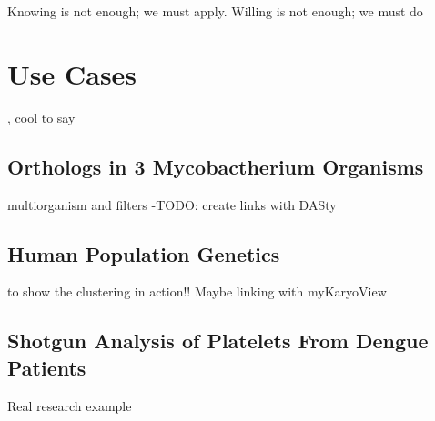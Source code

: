 \begin{savequote}[75mm] 
Knowing is not enough; we must apply. Willing is not enough; we must do
\end{savequote}

\chapter{Use Cases}

, cool to say

\section{Orthologs in 3 Mycobactherium Organisms}
\label{sec:orthologs}
multiorganism and filters -TODO: create links with DASty

\section{Human Population Genetics}
\label{sec:pop_genetics}
to show the clustering in action!! Maybe linking with myKaryoView

\section{Shotgun Analysis of Platelets From Dengue Patients}
\label{sec:dengue}
Real research example